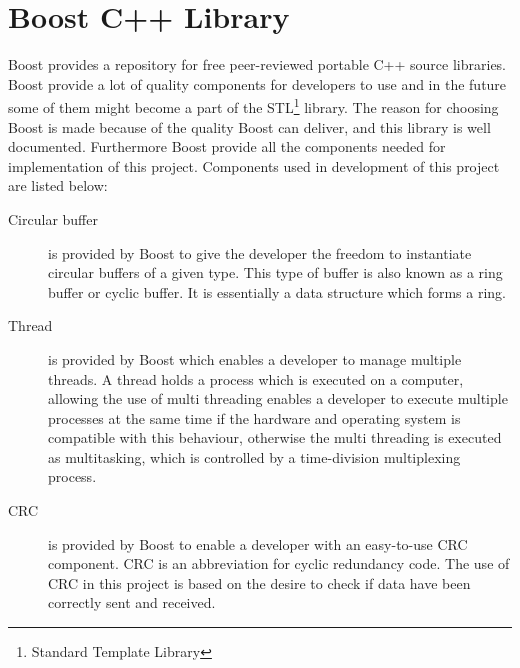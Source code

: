 \chapter{Boost C++ Library}\label{app:boost}
Boost provides a repository for free peer-reviewed portable C++ source libraries. Boost provide a lot of quality components for developers to use and in the future some of them might become a part of the STL\footnote{Standard Template Library} library. The reason for choosing Boost is made because of the quality Boost can deliver, and this library is well documented. Furthermore Boost provide all the components needed for implementation of this project. Components used in development of this project are listed below:

\begin{description}
\item[Circular buffer]
is provided by Boost to give the developer the freedom to instantiate circular buffers of a given type. This type of buffer is also known as a ring buffer or cyclic buffer. It is essentially a data structure which forms a ring. 

\item[Thread]
is provided by Boost which enables a developer to manage multiple threads. A thread holds a process which is executed on a computer, allowing the use of multi threading enables a developer to execute multiple processes at the same time if the hardware and operating system is compatible with this behaviour, otherwise the multi threading is executed as multitasking, which is controlled by a time-division multiplexing process.

\item[CRC]
is provided by Boost to enable a developer with an easy-to-use CRC component. CRC is an abbreviation for cyclic redundancy code. The use of CRC in this project is based on the desire to check if data have been correctly sent and received.
\end{description}